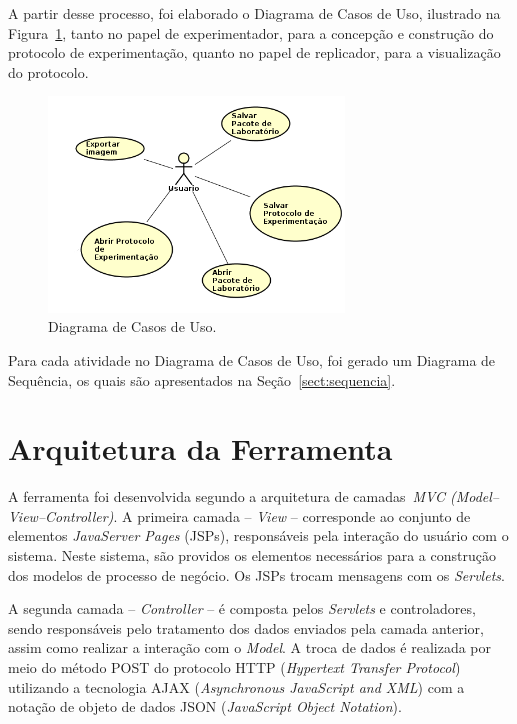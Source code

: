 A partir desse processo, foi elaborado o Diagrama de Casos de Uso, ilustrado na Figura~\ref{img:casosdeuso}, tanto no papel de experimentador, para a concepção e construção do protocolo de experimentação, quanto no papel de replicador, para a visualização do protocolo.


\begin{figure}[!htb]
\centering
\includegraphics[width=0.7\textwidth]{images/casosdeuso.png}
\caption{Diagrama de Casos de Uso.}
\label{img:casosdeuso}
\end{figure}


Para cada atividade no Diagrama de Casos de Uso, foi gerado um Diagrama de Sequência, os quais são apresentados na Seção~\ref{sect:sequencia}.


\section{Arquitetura da Ferramenta}

A ferramenta foi desenvolvida segundo a arquitetura de camadas~\textit{MVC (Model--View--Controller)}.
A primeira camada -- \textit{View} -- corresponde ao conjunto de elementos \textit{JavaServer Pages} (JSPs), responsáveis  pela interação do usuário com o sistema. Neste sistema, são providos os elementos necessários para a construção dos modelos de processo de negócio. Os JSPs trocam mensagens com os \textit{Servlets}.

A segunda camada -- \textit{Controller} -- é composta pelos \textit{Servlets} e controladores, sendo responsáveis pelo tratamento dos dados enviados pela camada anterior, assim como realizar a interação com o \textit{Model}. A troca de dados é realizada por meio do método POST do protocolo HTTP (\textit{Hypertext Transfer Protocol}) utilizando a tecnologia AJAX (\textit{Asynchronous JavaScript and XML}) com a notação de objeto de dados JSON (\textit{JavaScript Object Notation}).

